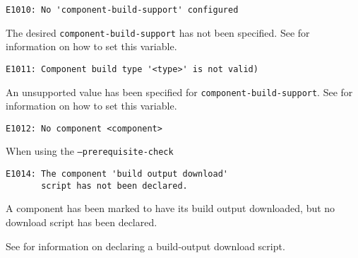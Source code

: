\begin{footnotesize}
\begin{verbatim}
E1010: No 'component-build-support' configured
\end{verbatim}
\end{footnotesize}

The desired \texttt{component-build-support} has not been specified.
See  for information on how to
set this variable.

\begin{footnotesize}
\begin{verbatim}
E1011: Component build type '<type>' is not valid)
\end{verbatim}
\end{footnotesize}

An unsupported value has been specified for
\texttt{component-build-support}.  See
 for information on how to set
this variable.

\begin{footnotesize}
\begin{verbatim}
E1012: No component <component>
\end{verbatim}
\end{footnotesize}

When using the \texttt{--prerequisite-check}

%


\begin{footnotesize}
\begin{verbatim}
E1014: The component 'build output download'
       script has not been declared.
\end{verbatim}
\end{footnotesize}

A component has been marked to have its build output downloaded, but
no download script has been declared.

See  for
information on declaring a build-output download script.


